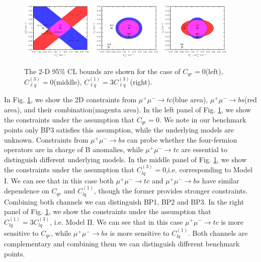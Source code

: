 \documentclass[a4paper,11pt]{article}
\begin{document}
\begin{figure}
    \includegraphics[width=0.31\textwidth]{2dbound-1.pdf}
    \includegraphics[width=0.31\textwidth]{2dbound-2.pdf}
    \includegraphics[width=0.31\textwidth]{2dbound-3.pdf}
\caption{The 2-D 95\% CL bounds are shown for the case of $C_{qe}=0$(left), $C_{\ell q}^{(3)}=0$(middle), $C_{\ell q}^{(1)}=3C_{\ell q}^{(3)}$(right).}\label{fig:cll2d}
\end{figure}

In Fig. \ref{fig:cll2d}, we show the 2D constraints from $\mu^+\mu^-\to tc$(blue area), $\mu^+\mu^-\to bs$(red area), and their combination(magenta area).
In the left panel of Fig. \ref{fig:cll2d}, we show the constraints under the assumption that $C_{qe}=0$.
We note in our benchmark points only BP3 satisfies this assumption,
while the underlying models are unknown.
Constraints from $\mu^+\mu^-\to bs$ can probe whether the four-fermion operators are in charge of B anomalies,
while $\mu^+\mu^-\to tc$ are essential to distinguish different underlying models.
In the middle panel of Fig. \ref{fig:cll2d},
we show the constraints under the assumption that $C_{lq}^{(3)}=0$,i.e. corresponding to Model I.
We can see that in this case both $\mu^+\mu^-\to tc$ and $\mu^+\mu^-\to bs$ have similar dependence on $C_{qe}$ and $C_{lq}^{(1)}$, though the former provides stronger constraints.
Combining both channels we can distinguish BP1, BP2 and BP3.
In the right panel of Fig. \ref{fig:cll2d},
we show the constraints under the assumption that $C_{lq}^{(1)}=3C_{lq}^{(3)}$, i.e. Model II.
We can see that in this case $\mu^+\mu^-\to tc$ is more sensitive to $C_{qe}$, while $\mu^+\mu^-\to bs$ is more sensitive to $C_{lq}^{(1)}$.
Both channels are complementary and combining them we can distinguish different benchmark points.
\end{document}
